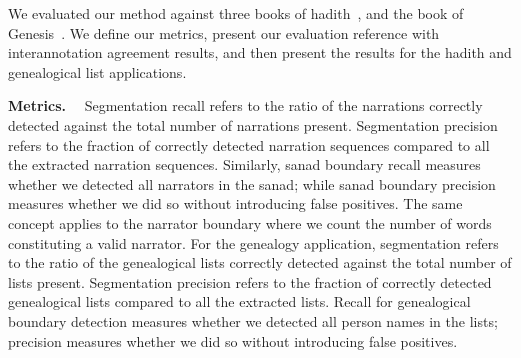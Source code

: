 \documentclass{llncs}
\begin{document}

%

We evaluated our method against three books of 
hadith~\cite{IbnHanbal,AlTousi,AlKulayni},
and the book of Genesis~\cite{}.
We define our metrics, present our evaluation reference with interannotation agreement results, 
and then present the results for the hadith
and genealogical list applications.

{\bf Metrics.}~~
Segmentation recall refers to the ratio of the narrations correctly detected against the
total number of narrations present. 
Segmentation precision refers to the fraction of correctly detected narration sequences compared to all the extracted
narration sequences. 
Similarly, sanad boundary recall measures whether we detected all narrators
in the sanad; while sanad boundary precision measures whether we did so without introducing false positives. 
The same concept applies to the narrator boundary where we count the number of words constituting 
a valid narrator.
For the genealogy application, segmentation refers to the ratio of the genealogical lists correctly detected against the total 
number of lists present.
Segmentation precision refers to the fraction of correctly detected genealogical lists compared to all the extracted lists. 
Recall for genealogical boundary detection measures whether we detected all person names in the lists; 
precision measures whether we did so without introducing false positives.
\end{document}
